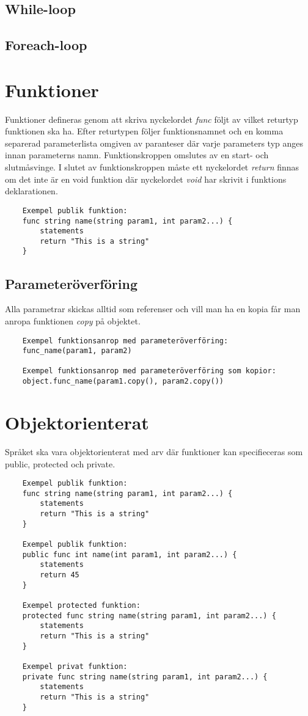 \documentclass{TDP003mall}
\begin{document}
\subsection{While-loop}

\subsection{Foreach-loop}

    \section{Funktioner}
    Funktioner defineras genom att skriva nyckelordet \emph{func} följt av vilket returtyp funktionen ska ha. Efter returtypen följer funktionsnamnet och en komma separerad parameterlista omgiven av paranteser där varje parameters typ anges innan parameterns namn. Funktionskroppen omslutes av en start- och slutmåsvinge. I slutet av funktionskroppen måste ett nyckelordet \emph{return} finnas om det inte är en void funktion där nyckelordet \emph{void} har skrivit i funktions deklarationen.

    \begin{verbatim}
    Exempel publik funktion:
    func string name(string param1, int param2...) {
        statements
        return "This is a string"
    }  
\end{verbatim}
    
    \subsection{Parameteröverföring}
    Alla parametrar skickas alltid som referenser och vill man ha en kopia får man anropa funktionen \emph{copy} på objektet.

\begin{verbatim}
    Exempel funktionsanrop med parameteröverföring:
    func_name(param1, param2)

    Exempel funktionsanrop med parameteröverföring som kopior:
    object.func_name(param1.copy(), param2.copy())
\end{verbatim}

    \section{Objektorienterat}
    Språket ska vara objektorienterat med arv där funktioner kan specifieceras som public, protected och private.

    \begin{verbatim}
    Exempel publik funktion:
    func string name(string param1, int param2...) {
        statements
        return "This is a string"
    } 

    Exempel publik funktion: 
    public func int name(int param1, int param2...) { 
        statements
        return 45 
    } 

    Exempel protected funktion: 
    protected func string name(string param1, int param2...) { 
        statements
        return "This is a string"
    } 

    Exempel privat funktion: 
    private func string name(string param1, int param2...) { 
        statements
        return "This is a string"
    } 
\end{verbatim}
\end{document}

